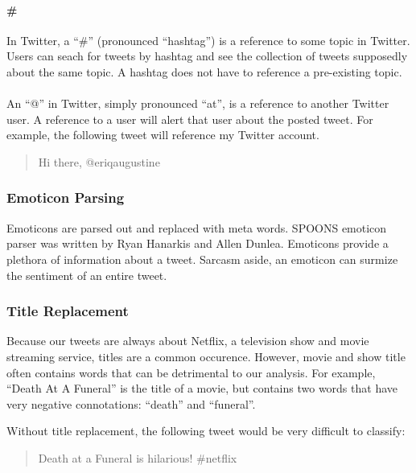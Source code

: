 \documentclass[12pt]{ucthesis}
\begin{document}
\paragraph{\#}
\label{class-twitter-symbols-hash}
In Twitter, a ``\#'' (pronounced ``hashtag'') is a reference to some topic in Twitter.
Users can seach for tweets by hashtag and see the collection of tweets supposedly about the
same topic. A hashtag does not have to reference a pre-existing topic.

\paragraph{\@}
\label{class-twitter-symbols-at}
An ``@'' in Twitter, simply pronounced ``at'', is a reference to another Twitter user.
A reference to a user will alert that user about the posted tweet.
For example, the following tweet will reference my Twitter account.

\begin{quote}
Hi there, @eriqaugustine
\end{quote}

\subsubsection{Emoticon Parsing}
\label{class-filter-emoticon}
Emoticons are parsed out and replaced with meta words.
SPOONS emoticon parser was written by Ryan Hanarkis and Allen Dunlea.
Emoticons provide a plethora of information about a tweet. Sarcasm aside,
an emoticon can surmize the sentiment of an entire tweet.

\subsubsection{Title Replacement}
\label{class-filter-title}
Because our tweets are always about Netflix, a television show and movie streaming service,
titles are a common occurence. However, movie and show title often contains words that can be
detrimental to our analysis. For example, ``Death At A Funeral'' is the title of a movie, but contains
two words that have very negative connotations: ``death'' and ``funeral''.

Without title replacement, the following tweet would be very difficult to classify:

\begin{quote}
Death at a Funeral is hilarious!  \#netflix
\end{quote}
\end{document}
